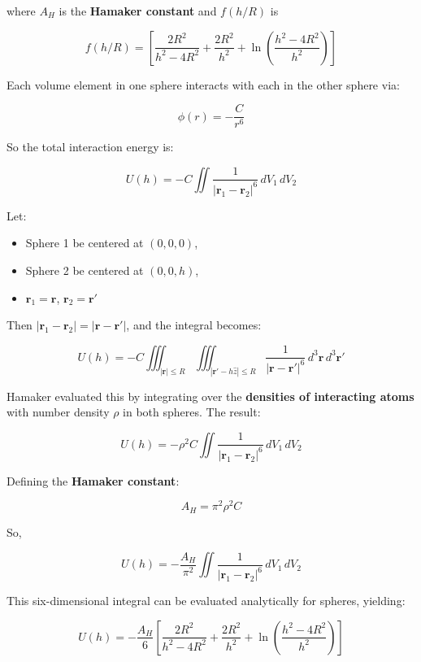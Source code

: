 \documentclass[
  letterpaper,
  enabledeprecatedfontcommands]{report}
\providecommand{\tightlist}{%
  \setlength{\itemsep}{0pt}\setlength{\parskip}{0pt}}
\begin{document}
where \(A_H\) is the \textbf{Hamaker constant} and \(f(h/R)\) is

\[f(h/R) = \left[ \frac{2R^2}{h^2 - 4R^2} + \frac{2R^2}{h^2} + \ln\left( \frac{h^2 - 4R^2}{h^2} \right) \right]\]

\begin{tcolorbox}[enhanced jigsaw, toprule=.15mm, opacityback=0, colbacktitle=quarto-callout-note-color!10!white, title=\textcolor{quarto-callout-note-color}{\faInfo}\hspace{0.5em}{Sketch of a derivation of colloid-colloid Van der Waals potential}, leftrule=.75mm, rightrule=.15mm, bottomtitle=1mm, breakable, colframe=quarto-callout-note-color-frame, colback=white, toptitle=1mm, left=2mm, titlerule=0mm, coltitle=black, arc=.35mm, bottomrule=.15mm, opacitybacktitle=0.6]

Each volume element in one sphere interacts with each in the other
sphere via:

\[
\phi(r) = -\frac{C}{r^6}
\]

So the total interaction energy is:

\[
U(h) = -C \iint \frac{1}{|\mathbf{r}_1 - \mathbf{r}_2|^6} \, dV_1 \, dV_2
\]

Let:

\begin{itemize}
\tightlist
\item
  Sphere 1 be centered at \((0, 0, 0)\),
\item
  Sphere 2 be centered at \((0, 0, h)\),
\item
  \(\mathbf{r}_1 = \mathbf{r}\), \(\mathbf{r}_2 = \mathbf{r}'\)
\end{itemize}

Then \(|\mathbf{r}_1 - \mathbf{r}_2| = |\mathbf{r} - \mathbf{r}'|\), and
the integral becomes:

\[
U(h) = -C \iiint_{|\mathbf{r}| \leq R} \iiint_{|\mathbf{r}' - h\hat{z}| \leq R} \frac{1}{|\mathbf{r} - \mathbf{r}'|^6} \, d^3\mathbf{r} \, d^3\mathbf{r}'
\]

Hamaker evaluated this by integrating over the \textbf{densities of
interacting atoms} with number density \(\rho\) in both spheres. The
result:

\[
U(h) = -\rho^2 C \iint \frac{1}{|\mathbf{r}_1 - \mathbf{r}_2|^6} \, dV_1 \, dV_2
\]

Defining the \textbf{Hamaker constant}:

\[
A_H = \pi^2 \rho^2 C
\]

So,

\[
U(h) = -\frac{A_H}{\pi^2} \iint \frac{1}{|\mathbf{r}_1 - \mathbf{r}_2|^6} \, dV_1 \, dV_2
\]

This six-dimensional integral can be evaluated analytically for spheres,
yielding:

\[
U(h) = -\frac{A_H}{6} \left[ \frac{2R^2}{h^2 - 4R^2} + \frac{2R^2}{h^2} + \ln\left( \frac{h^2 - 4R^2}{h^2} \right) \right]
\]

\end{tcolorbox}
\end{document}
